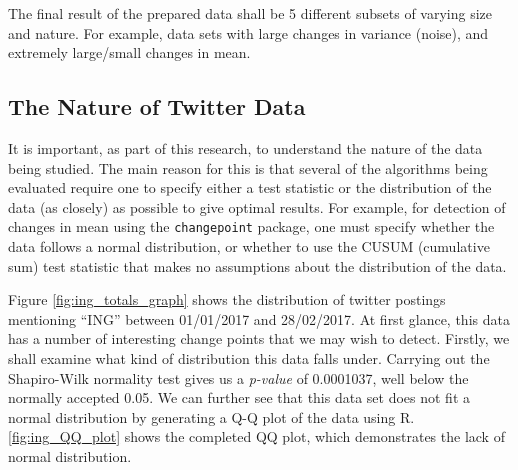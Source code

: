\documentclass{uvamscse}	%
\begin{document}


The final result of the prepared data shall be 5 different subsets of varying size and nature. For example, data sets with large changes in variance (noise), and extremely large/small changes in mean.

\subsection{The Nature of Twitter Data}

It is important, as part of this research, to understand the nature of the data being studied. The main reason for this is that several of the algorithms being evaluated require one to specify either a test statistic or the distribution of the data (as closely) as possible to give optimal results. For example, for detection of changes in mean using the \texttt{changepoint} package, one must specify whether the data follows a normal distribution, or whether to use the CUSUM (cumulative sum) test statistic that makes no assumptions about the distribution of the data.


Figure \ref{fig:ing_totals_graph} shows the distribution of twitter postings mentioning ``ING'' between 01/01/2017 and 28/02/2017. At first glance, this data has a number of interesting change points that we may wish to detect. Firstly, we shall examine what kind of distribution this data falls under. Carrying out the Shapiro-Wilk normality test gives us a \emph{p-value} of 0.0001037, well below the normally accepted 0.05. We can further see that this data set does not fit a normal distribution by generating a Q-Q plot of the data using R. \ref{fig:ing_QQ_plot} shows the completed QQ plot, which demonstrates the lack of normal distribution.

\end{document}

